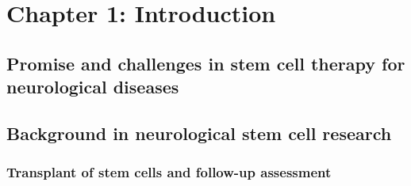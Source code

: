 \newpage
\section{Chapter 1: Introduction}

\subsection{Promise and challenges in stem cell  therapy for neurological diseases}


\subsection{Background in neurological stem cell  research}

\subsubsection{Transplant of stem cells and follow-up assessment}